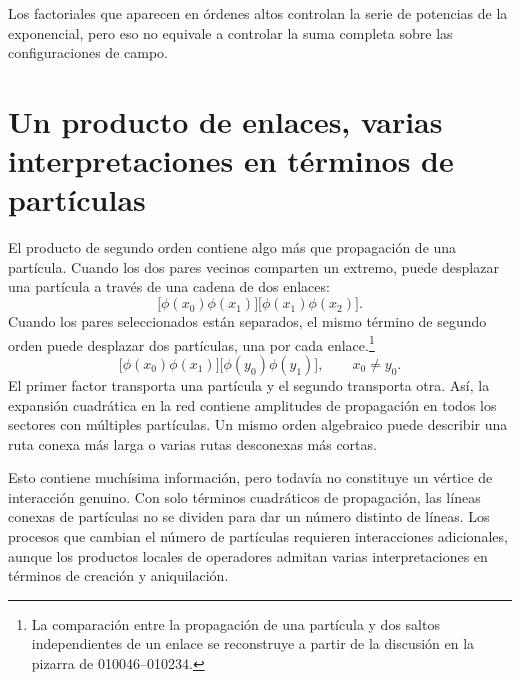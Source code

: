 Los factoriales que aparecen en órdenes altos controlan la serie de potencias de la exponencial, pero eso no equivale a controlar la suma completa sobre las configuraciones de campo.

\begin{classroomqa}\end{classroomqa}

\section{Un producto de enlaces, varias interpretaciones en términos de partículas}

El producto de segundo orden contiene algo más que propagación de una partícula. Cuando los dos pares vecinos comparten un extremo, puede desplazar una partícula a través de una cadena de dos enlaces:
\begin{equation}
\bigl[\phi(x_0)\phi(x_1)\bigr]
\bigl[\phi(x_1)\phi(x_2)\bigr].
\end{equation}
Cuando los pares seleccionados están separados, el mismo término de segundo orden puede desplazar dos partículas, una por cada enlace.\footnote{La comparación entre la propagación de una partícula y dos saltos independientes de un enlace se reconstruye a partir de la discusión en la pizarra de 010046--010234.}
\begin{equation}
\bigl[\phi(x_0)\phi(x_1)\bigr]
\bigl[\phi(y_0)\phi(y_1)\bigr],
\qquad x_0\neq y_0.
\end{equation}
El primer factor transporta una partícula y el segundo transporta otra. Así, la expansión cuadrática en la red contiene amplitudes de propagación en todos los sectores con múltiples partículas. Un mismo orden algebraico puede describir una ruta conexa más larga o varias rutas desconexas más cortas.

Esto contiene muchísima información, pero todavía no constituye un vértice de interacción genuino. Con solo términos cuadráticos de propagación, las líneas conexas de partículas no se dividen para dar un número distinto de líneas. Los procesos que cambian el número de partículas requieren interacciones adicionales, aunque los productos locales de operadores admitan varias interpretaciones en términos de creación y aniquilación.

